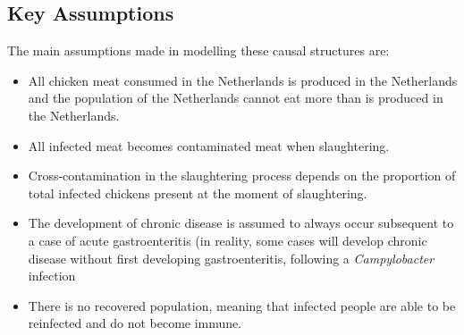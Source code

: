 \subsection{Key Assumptions}
\label{s:assumptions}
The main assumptions made in modelling these causal structures are:
\begin{itemize}
    \item All chicken meat consumed in the Netherlands is produced in the Netherlands and the population of the Netherlands cannot eat more than is produced in the Netherlands.
    \item All infected meat becomes contaminated meat when slaughtering.
    \item Cross-contamination in the slaughtering process depends on the proportion of total infected chickens present at the moment of slaughtering. %
    \item The development of chronic disease is assumed to always occur subsequent to a case of acute gastroenteritis (in reality, some cases will develop chronic disease without first developing gastroenteritis, following a \textit{Campylobacter} infection
    \item There is no recovered population, meaning that infected people are able to be reinfected and do not become immune.
\end{itemize}


